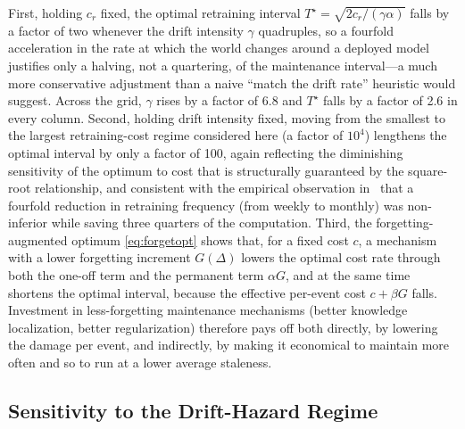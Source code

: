 \documentclass[electronics,article,submit,pdftex,moreauthors]{Definitions/mdpi}
\newcommand{\D}{\varDelta}                 %
\begin{document}
First, holding $c_r$ fixed, the optimal retraining interval $T^\star=\sqrt{2c_r/(\gamma\alpha)}$ falls by a factor of two whenever the drift intensity $\gamma$ quadruples, so a fourfold acceleration in the rate at which the world changes around a deployed model justifies only a halving, not a quartering, of the maintenance interval---a much more conservative adjustment than a naive ``match the drift rate'' heuristic would suggest. Across the grid, $\gamma$ rises by a factor of 6.8 and $T^\star$ falls by a factor of 2.6 in every column. Second, holding drift intensity fixed, moving from the smallest to the largest retraining-cost regime considered here (a factor of $10^4$) lengthens the optimal interval by only a factor of 100, again reflecting the diminishing sensitivity of the optimum to cost that is structurally guaranteed by the square-root relationship, and consistent with the empirical observation in~\cite{Williams2026} that a fourfold reduction in retraining frequency (from weekly to monthly) was non-inferior while saving three quarters of the computation. Third, the forgetting-augmented optimum \eqref{eq:forgetopt} shows that, for a fixed cost $c$, a mechanism with a lower forgetting increment $G(\D)$ lowers the optimal cost rate through both the one-off term and the permanent term $\alpha G$, and at the same time shortens the optimal interval, because the effective per-event cost $c+\beta G$ falls. Investment in less-forgetting maintenance mechanisms (better knowledge localization, better regularization) therefore pays off both directly, by lowering the damage per event, and indirectly, by making it economical to maintain more often and so to run at a lower average staleness.

\subsection{Sensitivity to the Drift-Hazard Regime}\label{sec:hazardsens}
\end{document}
